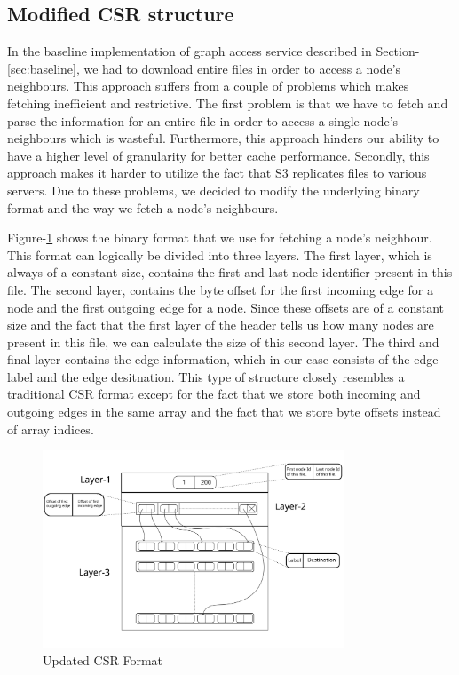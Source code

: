 \subsection{Modified CSR structure}\label{sec:modifiedCsr}
In the baseline implementation of graph access service described in
Section-\ref{sec:baseline}, we had to download entire files in order to access
a node's neighbours. This approach suffers from a couple of problems which makes
fetching inefficient and restrictive. The first problem is that we have to
fetch and parse the information for an entire file in order to access a single
node's neighbours which is wasteful. Furthermore, this approach hinders our
ability to have a  higher level of granularity for better cache performance.
Secondly, this approach makes it harder to utilize the fact that S3 replicates
files to various servers. Due to these problems, we decided to modify the
underlying binary format and the way we fetch a node's neighbours.

\medskip
Figure-\ref{fig:csrFormat} shows the binary format that we use for fetching a
node's neighbour. This format can logically be divided into three layers. The
first layer, which is always of a constant size, contains the first and last
node identifier present in this file. The second layer, contains the byte offset
for the first incoming edge for a node and the first outgoing edge for a node.
Since these offsets are of a constant size and the fact that the first layer of
the header tells us how many nodes are present in this file, we can calculate
the size of this second layer. The third and final layer contains the edge
information, which in our case consists of the edge label and the edge
desitnation. This type of structure closely resembles a traditional CSR format
except for the fact that we store both incoming and outgoing edges in the same
array and the fact that we store byte offsets instead of array indices.
\begin{figure}[ht]
    \centering
    \includegraphics[width=0.8\textwidth]{figures/csrFormat.png}
    \caption{Updated CSR Format}
    \label{fig:csrFormat}
\end{figure}

